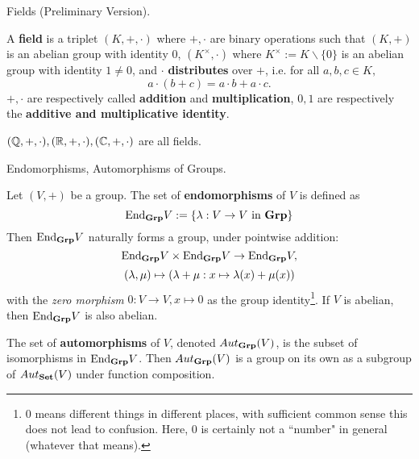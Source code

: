\documentclass[../../book.tex]{subfiles}
\begin{document}
\begin{dfn} Fields (Preliminary Version).

    A \textbf{field} is a triplet $(K,+,\cdot)$ where
    $+, \cdot$ are binary operations such that
    $(K,+)$ is an abelian group with identity $0$,
    $(K^\times,\cdot)$ where $K^\times := K\backslash\{0\}$
    is an abelian group with identity $1 \neq 0$,
    and $\cdot$ \textbf{distributes} over $+$, i.e. for all
    $a, b, c \in K,$ 
    \[a \cdot (b + c) = a \cdot b + a \cdot c.\]
    $+,\cdot$ are respectively called \textbf{addition} and \textbf{multiplication}, 
    $0, 1$ are respectively the \textbf{additive and multiplicative identity}. 
\end{dfn}

\begin{eg}
    $(\mathbb{Q},+,\cdot), (\mathbb{R},+,\cdot), (\mathbb{C},+,\cdot)$ are all fields. 
\end{eg}

\begin{dfn} Endomorphisms, Automorphisms of Groups.

    Let $(V,+)$ be a group. 
    The set of \textbf{endomorphisms} of $V$ is defined as
    \[ 
        \mathrm{End}_{\mathbf{Grp}}V := \{\lambda : V \to V \text{ in } \mathbf{Grp}\} 
    \]
    Then $\mathrm{End}_{\mathbf{Grp}}V$ naturally forms a group, under pointwise addition:
    \[
        \mathrm{End}_{\mathbf{Grp}}V \times \mathrm{End}_{\mathbf{Grp}}V \to \mathrm{End}_{\mathbf{Grp}}V, 
    \]
    \[
        (\lambda, \mu) \mapsto (\lambda + \mu : x \mapsto \lambda(x) + \mu(x))
    \]
    with the \emph{zero morphism} $0 : V \to V, 
    x \mapsto 0$ as the group identity\footnote{
    $0$ means different things in different places,
    with sufficient common sense this does not lead to confusion. 
    Here, $0$ is certainly not a ``number" in general 
    (whatever that means).}.
    If $V$ is abelian, then $\mathrm{End}_{\mathbf{Grp}}V$ is also abelian. 
    
    The set of \textbf{automorphisms} of $V$, denoted $Aut_{\mathbf{Grp}}(V)$, 
    is the subset of isomorphisms in $\mathrm{End}_{\mathbf{Grp}}V$. 
    Then $Aut_{\mathbf{Grp}}(V)$ is a group on its own
    as a subgroup of $Aut_{\mathbf{Set}}(V)$ under function composition. 
    
\end{dfn}
\end{document}
